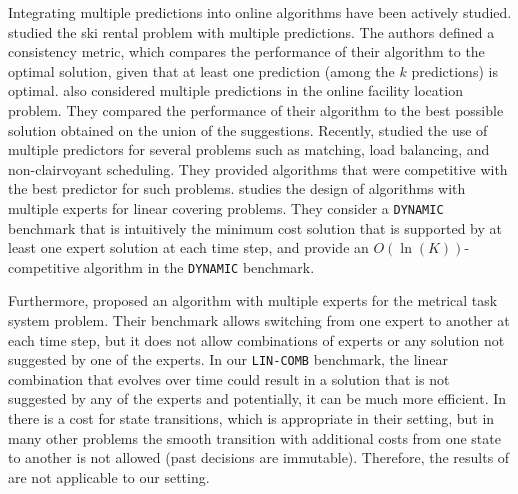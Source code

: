 Integrating multiple predictions into online algorithms have been actively studied.
\cite{GollapudiPanigrahi19:skirental-multiple-predictions} studied the ski rental problem with multiple predictions.
The authors defined a consistency metric, which compares the performance of their algorithm to the optimal solution, given that at least one prediction (among the $k$ predictions) is optimal.
\cite{AlmanzaChierichetti21:Online-Facility} also considered multiple predictions in the online facility location problem.
They compared the performance of their algorithm to the best possible solution obtained on the union of the suggestions. Recently, \cite{DinitzIm:Algorithms-with} studied the use of multiple predictors for several problems such as matching, load balancing, and non-clairvoyant scheduling. They provided algorithms that were competitive with the best predictor for such problems.
\cite{AnandGe22:Online-Algorithms} studies the design of algorithms with multiple experts for linear covering problems.
They consider a \texttt{DYNAMIC} benchmark that is intuitively
the minimum cost solution that is supported by at least one expert solution at each time step,
and provide an $O(\ln(K))$-competitive algorithm in the \texttt{DYNAMIC} benchmark.


Furthermore, \cite{AntoniosEtAll23:mixing-predictions-metric-algorithms} proposed an algorithm with multiple experts for the metrical task system problem. Their benchmark allows switching from one expert to another at each time step, but it does not allow combinations of experts or any solution not suggested by one of the experts. In our \texttt{LIN-COMB} benchmark, the linear combination that evolves over time could result in a solution that is not suggested by any of the experts and potentially, it can be much more efficient. In \cite{AntoniosEtAll23:mixing-predictions-metric-algorithms} there is a cost for state transitions, which is appropriate in their setting, but in many other problems the smooth transition with additional costs from one state to another is not allowed (past decisions are immutable). Therefore, the results of \cite{AntoniosEtAll23:mixing-predictions-metric-algorithms} are not applicable to our setting.

